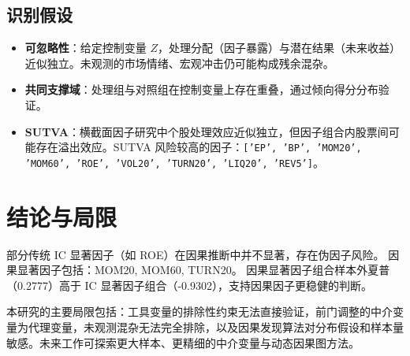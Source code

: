 \documentclass[12pt,a4paper]{ctexart}
\begin{document}
\subsection{识别假设}
\begin{itemize}
    \item \textbf{可忽略性}：给定控制变量 $Z$，处理分配（因子暴露）与潜在结果（未来收益）近似独立。未观测的市场情绪、宏观冲击仍可能构成残余混杂。
    \item \textbf{共同支撑域}：处理组与对照组在控制变量上存在重叠，通过倾向得分分布验证。
    \item \textbf{SUTVA}：横截面因子研究中个股处理效应近似独立，但因子组合内股票间可能存在溢出效应。SUTVA 风险较高的因子：\texttt{['EP', 'BP', 'MOM20', 'MOM60', 'ROE', 'VOL20', 'TURN20', 'LIQ20', 'REV5']}。
\end{itemize}

\section{结论与局限}
部分传统 IC 显著因子（如 ROE）在因果推断中并不显著，存在伪因子风险。 因果显著因子包括：MOM20, MOM60, TURN20。 因果显著因子组合样本外夏普（0.2777）高于 IC 显著因子组合（-0.9302），支持因果因子更稳健的判断。

本研究的主要局限包括：工具变量的排除性约束无法直接验证，前门调整的中介变量为代理变量，未观测混杂无法完全排除，以及因果发现算法对分布假设和样本量敏感。未来工作可探索更大样本、更精细的中介变量与动态因果图方法。



\end{document}
